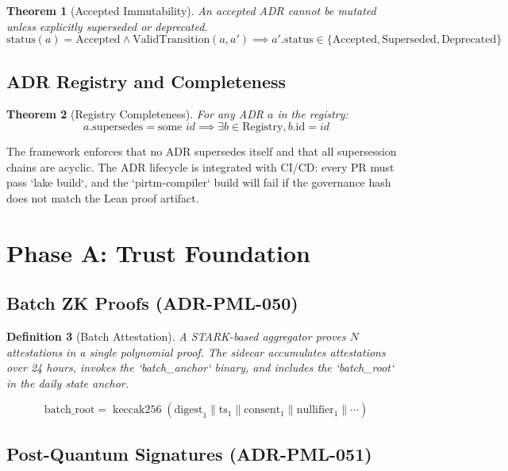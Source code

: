 \documentclass[11pt,a4paper]{article}
\newtheorem{theorem}{Theorem}[section]
\newtheorem{definition}[theorem]{Definition}
\DeclareMathOperator{\keccak}{keccak256}
\begin{document}
\begin{theorem}[Accepted Immutability]
An accepted ADR cannot be mutated unless explicitly superseded or deprecated.
\[
\text{status}(a) = \text{Accepted} \land \text{ValidTransition}(a, a') \implies 
a'.\text{status} \in \{\text{Accepted}, \text{Superseded}, \text{Deprecated}\}
\]
\end{theorem}

\subsection{ADR Registry and Completeness}

\begin{theorem}[Registry Completeness]
For any ADR $a$ in the registry:
\[
a.\text{supersedes} = \text{some } id \implies \exists b \in \text{Registry}, b.\text{id} = id
\]
\end{theorem}

The framework enforces that no ADR supersedes itself and that all supersession chains are acyclic. The ADR lifecycle is integrated with CI/CD: every PR must pass `lake build`, and the `pirtm-compiler` build will fail if the governance hash does not match the Lean proof artifact.

\section{Phase A: Trust Foundation}

\subsection{Batch ZK Proofs (ADR-PML-050)}

\begin{definition}[Batch Attestation]
A STARK-based aggregator proves $N$ attestations in a single polynomial proof. The sidecar accumulates attestations over 24 hours, invokes the `batch_anchor` binary, and includes the `batch_root` in the daily state anchor.
\end{definition}

\begin{equation}
    \text{batch\_root} = \keccak(\text{digest}_1 \| \text{ts}_1 \| \text{consent}_1 \| \text{nullifier}_1 \| \cdots)
\end{equation}

\subsection{Post-Quantum Signatures (ADR-PML-051)}
\end{document}
